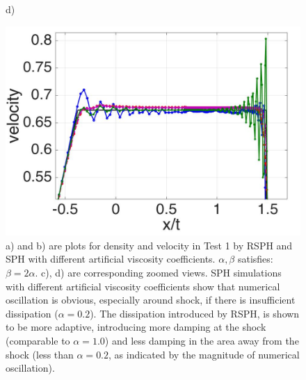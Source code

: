 \documentclass[preprint,12pt,authoryear]{elsarticle}
\begin{document}
\begin{figure}[H]
\begin{minipage}{.45 \textwidth}
    \end{minipage}%
    \begin{minipage}{.545\textwidth}
    \centering d)
        \begin{flushleft}
        \includegraphics[width= 0.8174 \textwidth, height=0.5780 \textwidth]{./Figures/RCM-Sod-SPH-alf-v-zoom}    
        \end{flushleft}
    \end{minipage}%
    \caption{a) and b) are plots for density and velocity in Test 1 by RSPH and SPH with different artificial viscosity coefficients. $\alpha,\beta$ satisfies: $\beta=2\alpha$.  c), d) are corresponding zoomed views. SPH simulations with different artificial viscosity coefficients show that numerical oscillation is obvious, especially around shock, if there is insufficient dissipation ($\alpha=0.2$). The dissipation introduced by RSPH, is shown to be more adaptive, introducing more damping at the shock (comparable to $\alpha=1.0$) and less damping in the area away from the shock (less than $\alpha=0.2$, as indicated by the magnitude of numerical oscillation).}
    \label{fig:RCM-Sod-SPH-alf}
\end{figure}
\end{document}
